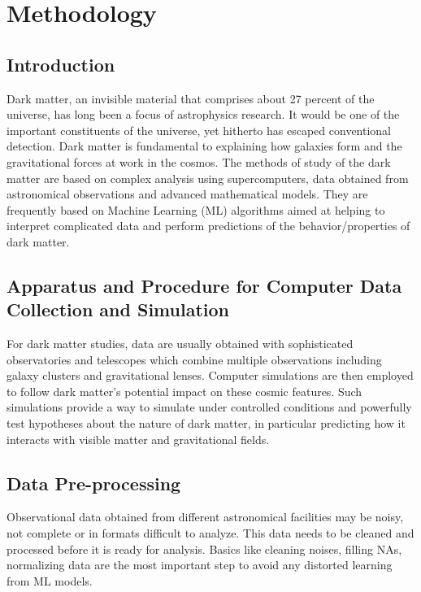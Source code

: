 \chapter{Methodology}
\label{chap:3}

\section{Introduction} 

Dark matter, an invisible material that comprises about 27 percent of the universe, has long been a focus of astrophysics research. It would be one of the important constituents of the universe, yet hitherto has escaped conventional detection. Dark matter is fundamental to explaining how galaxies form and the gravitational forces at work in the cosmos. The methods of study of the dark matter are based on complex analysis using supercomputers, data obtained from astronomical observations and advanced mathematical models. They are frequently based on Machine Learning (ML) algorithms aimed at helping to interpret complicated data and perform predictions of the behavior/properties of dark matter.



\section{Apparatus and Procedure for Computer Data Collection and Simulation}

For dark matter studies, data are usually obtained with sophisticated observatories and telescopes which combine multiple observations including galaxy clusters and gravitational lenses. Computer simulations are then employed to follow dark matter’s potential impact on these cosmic features. Such simulations provide a way to simulate under controlled conditions and powerfully test hypotheses about the nature of dark matter, in particular predicting how it interacts with visible matter and gravitational fields.

\section{Data Pre-processing}

Observational data obtained from different astronomical facilities may be noisy, not complete or in formats difficult to analyze. This data needs to be cleaned and processed before it is ready for analysis. Basics like cleaning noises, filling NAs, normalizing data are the most important step to avoid any distorted learning from ML models.
